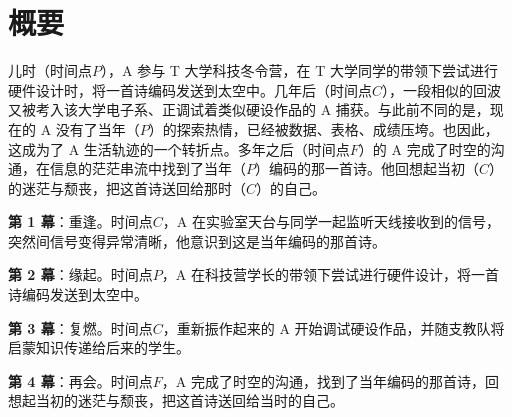 \documentclass[10pt, a5paper, oneside]{memoir}
\begin{document}
\clearpage

\chapter*{概要}

儿时（时间点\(P\)），A 参与 T 大学科技冬令营，在 T 大学同学的带领下尝试进行硬件设计时，将一首诗编码发送到太空中。几年后（时间点\(C\)），一段相似的回波又被考入该大学电子系、正调试着类似硬设作品的 A 捕获。与此前不同的是，现在的 A 没有了当年（\(P\)）的探索热情，已经被数据、表格、成绩压垮。也因此，这成为了 A 生活轨迹的一个转折点。多年之后（时间点\(F\)）的 A 完成了时空的沟通，在信息的茫茫串流中找到了当年（\(P\)）编码的那一首诗。他回想起当初（\(C\)）的迷茫与颓丧，把这首诗送回给那时（\(C\)）的自己。

\textbf{第 1 幕}：重逢。时间点\(C\)，A 在实验室天台与同学一起监听天线接收到的信号，突然间信号变得异常清晰，他意识到这是当年编码的那首诗。

\textbf{第 2 幕}：缘起。时间点\(P\)，A 在科技营学长的带领下尝试进行硬件设计，将一首诗编码发送到太空中。

\textbf{第 3 幕}：复燃。时间点\(C\)，重新振作起来的 A 开始调试硬设作品，并随支教队将启蒙知识传递给后来的学生。

\textbf{第 4 幕}：再会。时间点\(F\)，A 完成了时空的沟通，找到了当年编码的那首诗，回想起当初的迷茫与颓丧，把这首诗送回给当时的自己。
\end{document}
